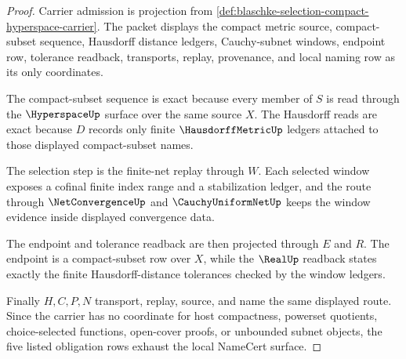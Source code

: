 \begin{proof}
Carrier admission is projection from \autoref{def:blaschke-selection-compact-hyperspace-carrier}. The packet displays the compact metric source, compact-subset sequence, Hausdorff distance ledgers, Cauchy-subnet windows, endpoint row, tolerance readback, transports, replay, provenance, and local naming row as its only coordinates.

The compact-subset sequence is exact because every member of $S$ is read through the $\HyperspaceUp$ surface over the same source $X$. The Hausdorff reads are exact because $D$ records only finite $\HausdorffMetricUp$ ledgers attached to those displayed compact-subset names.

The selection step is the finite-net replay through $W$. Each selected window exposes a cofinal finite index range and a stabilization ledger, and the route through $\NetConvergenceUp$ and $\CauchyUniformNetUp$ keeps the window evidence inside displayed convergence data.

The endpoint and tolerance readback are then projected through $E$ and $R$. The endpoint is a compact-subset row over $X$, while the $\RealUp$ readback states exactly the finite Hausdorff-distance tolerances checked by the window ledgers.

Finally $H,C,P,N$ transport, replay, source, and name the same displayed route. Since the carrier has no coordinate for host compactness, powerset quotients, choice-selected functions, open-cover proofs, or unbounded subnet objects, the five listed obligation rows exhaust the local NameCert surface.
\end{proof}


\begin{closurestatus}{\BlaschkeSelectionCompactHyperspaceUp}
  \theoryclosure{\seedClosure}
  \formalstatus{\unformalizedV}
\end{closurestatus}
